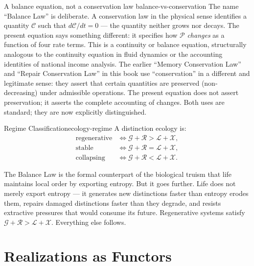 \documentclass[12pt,twoside,openright]{book}
\begin{document}
\begin{remark}{A balance equation, not a conservation law}%
  {balance-vs-conservation}
  The name ``Balance Law'' is deliberate. A conservation law
  in the physical sense identifies a quantity $\mathcal{C}$
  such that $d\mathcal{C}/dt = 0$ --- the quantity neither
  grows nor decays. The present equation says something
  different: it specifies how $\mathcal{P}$ \emph{changes}
  as a function of four rate terms. This is a continuity
  or balance equation, structurally analogous to the
  continuity equation in fluid dynamics or the accounting
  identities of national income analysis. The earlier
  ``Memory Conservation Law'' and ``Repair Conservation
  Law'' in this book use ``conservation'' in a different
  and legitimate sense: they assert that certain
  quantities are preserved (non-decreasing) under
  admissible operations. The present equation does not
  assert preservation; it asserts the complete accounting
  of changes. Both uses are standard; they are now
  explicitly distinguished.
\end{remark}

\begin{corollary}{Regime Classification}{ecology-regime}
  A distinction ecology is:
  \begin{align*}
    \text{regenerative} &\iff
    \mathcal{G}+\mathcal{R} > \mathcal{L}+\mathcal{X}, \\
    \text{stable}       &\iff
    \mathcal{G}+\mathcal{R} = \mathcal{L}+\mathcal{X}, \\
    \text{collapsing}   &\iff
    \mathcal{G}+\mathcal{R} < \mathcal{L}+\mathcal{X}.
  \end{align*}
\end{corollary}

\noindent
The Balance Law is the formal counterpart of the
biological truism that life maintains local order by
exporting entropy. But it goes further. Life does not
merely export entropy --- it generates new distinctions
faster than entropy erodes them, repairs damaged
distinctions faster than they degrade, and resists
extractive pressures that would consume its future.
Regenerative systems satisfy $\mathcal{G} + \mathcal{R}
> \mathcal{L} + \mathcal{X}$. Everything else follows.

\section{Realizations as Functors}
\label{sec:ch30-functors}
\end{document}
